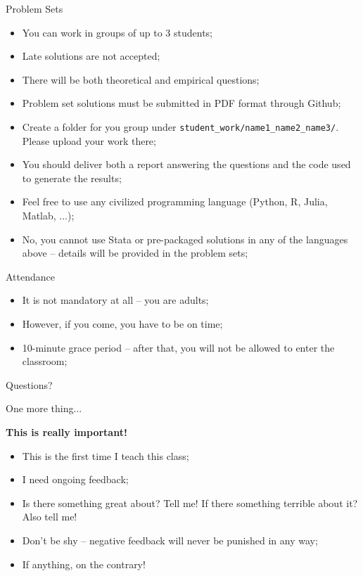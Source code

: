 \documentclass[aspectratio=169, xcolor=dvipsnames, 12pt]{beamer}
\begin{document}
\begin{frame}{Problem Sets}
\begin{itemize}
  \item You can work in groups of up to 3 students;
  \item Late solutions are not accepted;
  \item There will be both theoretical and empirical questions;
  \item Problem set solutions must be submitted in PDF format through Github;
  \item Create a folder for you group under \texttt{student\_work/name1\_name2\_name3/}. Please upload your work there;
  \item You should deliver both a report answering the questions and the code used to generate the results;
  \item Feel free to use any civilized programming language (Python, R, Julia, Matlab, ...);
  \item No, you cannot use Stata or pre-packaged solutions in any of the languages above -- details will be provided in the problem sets;
\end{itemize}
\end{frame}

\begin{frame}{Attendance}
\begin{itemize}
  \item It is not mandatory at all -- you are adults;
  \item However, if you come, you have to be on time;
  \item 10-minute grace period -- after that, you will not be allowed to enter the classroom;
\end{itemize}
  
\end{frame}
\begin{frame}[standout]
Questions?
\end{frame}

\begin{frame}{One more thing...}
  \begin{center}
    \alert{\textbf{This is really important!}}
  \end{center}
  \begin{itemize}
    \item This is the first time I teach this class;
    \item I need ongoing feedback;
    \item Is there something great about? Tell me! If there something terrible about it? Also tell me!
    \item Don't be shy -- negative feedback will never be punished in any way;
    \item If anything, on the contrary!
  \end{itemize}
\end{frame}
\end{document}
